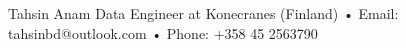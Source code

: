 

\begin{cvskills}

  \cvskill
    {Tahsin Anam} %
    {Data Engineer at Konecranes (Finland) • Email: tahsinbd@outlook.com • Phone: +358 45 2563790 }%



\end{cvskills}
